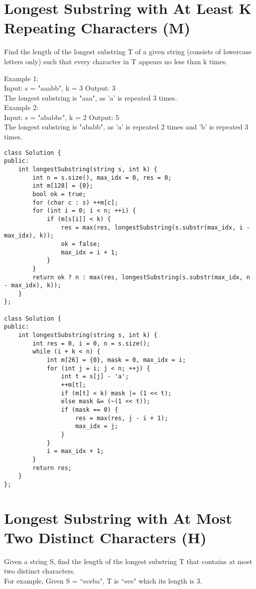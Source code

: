 \section{Longest Substring with At Least K Repeating Characters (M)}
Find the length of the longest substring T of a given string (consists of lowercase letters only) such that every character in T appears no less than k times.

Example 1:\\
Input:
s = "aaabb", k = 3
Output:
3\\
The longest substring is "aaa", as 'a' is repeated 3 times.\\

Example 2:\\
Input:
s = "ababbc", k = 2
Output:
5\\
The longest substring is "ababb", as 'a' is repeated 2 times and 'b' is repeated 3 times.\\

\begin{lstlisting}
class Solution {
public:
    int longestSubstring(string s, int k) {
        int n = s.size(), max_idx = 0, res = 0;
        int m[128] = {0};
        bool ok = true;
        for (char c : s) ++m[c];
        for (int i = 0; i < n; ++i) {
            if (m[s[i]] < k) {
                res = max(res, longestSubstring(s.substr(max_idx, i - max_idx), k));
                ok = false;
                max_idx = i + 1;
            }
        }
        return ok ? n : max(res, longestSubstring(s.substr(max_idx, n - max_idx), k));
    }
};

class Solution {
public:
    int longestSubstring(string s, int k) {
        int res = 0, i = 0, n = s.size();
        while (i + k < n) {
            int m[26] = {0}, mask = 0, max_idx = i;
            for (int j = i; j < n; ++j) {
                int t = s[j] - 'a';
                ++m[t];
                if (m[t] < k) mask |= (1 << t);
                else mask &= (~(1 << t));
                if (mask == 0) {
                    res = max(res, j - i + 1);
                    max_idx = j;
                }
            }
            i = max_idx + 1;
        }
        return res;
    }
};
\end{lstlisting}


\section{Longest Substring with At Most Two Distinct Characters (H)}
Given a string S, find the length of the longest substring T that contains at most two distinct characters.\\
For example,
Given S = ``eceba",
T is ``ece" which its length is 3. \\

